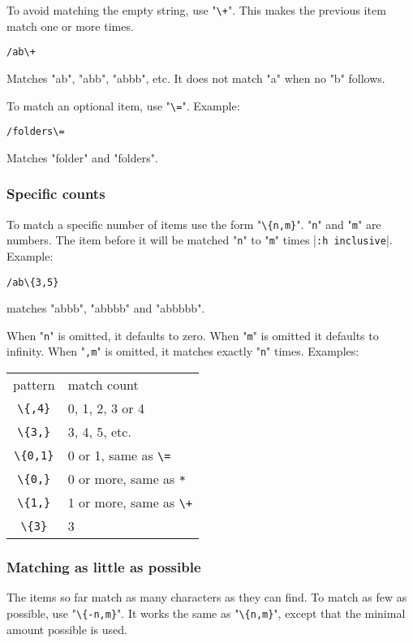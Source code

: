 To avoid matching the empty string, use "\verb!\+!".
This makes the previous item match one or more times.

\begin{Verbatim}[samepage=true]
 /ab\+
\end{Verbatim}

Matches "ab", "abb", "abbb", etc.
It does not match "a" when no "b" follows.

To match an optional item, use "\verb!\=!".
Example:

\begin{Verbatim}[samepage=true]
 /folders\=
\end{Verbatim}

Matches "folder" and "folders".
\subsubsection{Specific counts}
To match a specific number of items use the form "\verb!\{n,m}!".
"\verb!n!" and "\verb!m!" are numbers.
The item before it will be matched "\verb!n!" to "\verb!m!" times |\verb!:h inclusive!|.
Example:

\begin{Verbatim}[samepage=true]
 /ab\{3,5}
\end{Verbatim}

matches "abbb", "abbbb" and "abbbbb".

When "\verb!n!" is omitted, it defaults to zero.
When "\verb!m!" is omitted it defaults to infinity.
When "\verb!,m!" is omitted, it matches exactly "\verb!n!" times.
Examples:

\begin{center} \begin{tabular}{c l}
				pattern & match count \\
				\verb!\{,4}! & 0, 1, 2, 3 or 4 \\
				\verb!\{3,}! & 3, 4, 5, etc. \\
				\verb!\{0,1}! & 0 or 1, same as \verb!\=! \\
				\verb!\{0,}! & 0 or more, same as \verb!*! \\
				\verb!\{1,}! & 1 or more, same as \verb!\+! \\
				\verb!\{3}! & 3 \\
\end{tabular} \end{center}
\subsubsection{Matching as little as possible}
The items so far match as many characters as they can find.
To match as few as possible, use "\verb!\{-n,m}!".
It works the same as "\verb!\{n,m}!", except that the minimal amount possible is used.

